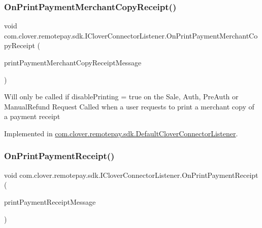 \subsubsection{\texorpdfstring{On\+Print\+Payment\+Merchant\+Copy\+Receipt()}{OnPrintPaymentMerchantCopyReceipt()}}
{\footnotesize\ttfamily void com.\+clover.\+remotepay.\+sdk.\+I\+Clover\+Connector\+Listener.\+On\+Print\+Payment\+Merchant\+Copy\+Receipt (\begin{DoxyParamCaption}\item[{\hyperlink{classcom_1_1clover_1_1remotepay_1_1sdk_1_1_print_payment_merchant_copy_receipt_message}{Print\+Payment\+Merchant\+Copy\+Receipt\+Message}}]{print\+Payment\+Merchant\+Copy\+Receipt\+Message }\end{DoxyParamCaption})}



Will only be called if disable\+Printing = true on the Sale, Auth, Pre\+Auth or Manual\+Refund Request Called when a user requests to print a merchant copy of a payment receipt 



Implemented in \hyperlink{classcom_1_1clover_1_1remotepay_1_1sdk_1_1_default_clover_connector_listener_a308bf50f9fbf9bb6ec0955adde11a429}{com.\+clover.\+remotepay.\+sdk.\+Default\+Clover\+Connector\+Listener}.

\mbox{\label{interfacecom_1_1clover_1_1remotepay_1_1sdk_1_1_i_clover_connector_listener_ab37a0d5e7114499b3f1c55e38f6c46c9}} 
\subsubsection{\texorpdfstring{On\+Print\+Payment\+Receipt()}{OnPrintPaymentReceipt()}}
{\footnotesize\ttfamily void com.\+clover.\+remotepay.\+sdk.\+I\+Clover\+Connector\+Listener.\+On\+Print\+Payment\+Receipt (\begin{DoxyParamCaption}\item[{\hyperlink{classcom_1_1clover_1_1remotepay_1_1sdk_1_1_print_payment_receipt_message}{Print\+Payment\+Receipt\+Message}}]{print\+Payment\+Receipt\+Message }\end{DoxyParamCaption})}



